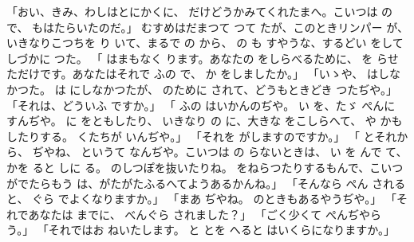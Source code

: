 \documentclass[a4paper,
tate,
book]
{jlreq}
\begin{document}
「おい、きみ、わしはとにかくに、 だけどうかみてくれたまへ。こいつは の で、 もはたらいたのだ。」
  むすめはだまつて つて たが、このときリンパー が、いきなりこつちを り いて、まるで の から、 の も すやうな、するどい をしてしづかに つた。
「 はまもなく ります。あなたの をしらべるために、 を らせただけです。あなたはそれで ふの で、 か をしましたか。」
「いゝや、 はしなかつた。 は にしなかつたが、 のために されて、どうもときどき つたぢや。」
「それは、どういふ
 ですか。」
「 ふの はいかんのぢや。  い を、たゞ ぺんに すんぢや。 に  をともしたり、 いきなり の に、大きな をこしらへて、 や かも したりする。 くたちが いんぢや。」
「それを がしますのですか。」
「 とそれから、 ぢやね、 というて なんぢや。こいつは の らないときは、 い を んで て、 かを ると しに る。 のしつぽを抜いたりね。 をねらつたりするもんで、こいつがでたらもう は、がたがたふるへてようあるかんね。」
「そんなら ペん されると、 ぐら でよくなりますか。」
「まあ ぢやね。 のときもあるやうぢや。」
「それであなたは までに、 べんぐら  されました？」
「ごく少くて ぺんぢやらう。」
「それではお ねいたします。 と とを へると はいくらになりますか。」
\end{document}

